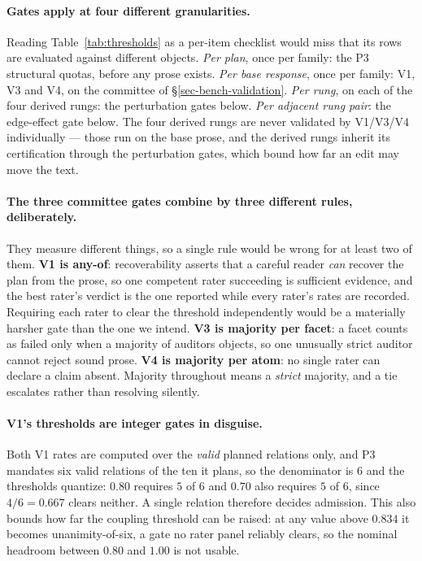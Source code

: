 \paragraph{Gates apply at four different granularities.} Reading Table~\ref{tab:thresholds} as a
per-item checklist would miss that its rows are evaluated against different objects.
\emph{Per plan}, once per family: the P3 structural quotas, before any prose exists.
\emph{Per base response}, once per family: V1, V3 and V4, on the committee of
\S\ref{sec-bench-validation}. \emph{Per rung}, on each of the four derived rungs: the perturbation gates
below. \emph{Per adjacent rung pair}: the edge-effect gate below. The four derived rungs are never
validated by V1/V3/V4 individually --- those run on the base prose, and the derived rungs inherit its
certification through the perturbation gates, which bound how far an edit may move the text.

\paragraph{The three committee gates combine by three different rules, deliberately.} They measure
different things, so a single rule would be wrong for at least two of them.
\textbf{V1 is any-of}: recoverability asserts that a careful reader \emph{can} recover the plan from the
prose, so one competent rater succeeding is sufficient evidence, and the best rater's verdict is the one
reported while every rater's rates are recorded. Requiring each rater to clear the threshold independently
would be a materially harsher gate than the one we intend. \textbf{V3 is majority per facet}: a facet
counts as failed only when a majority of auditors objects, so one unusually strict auditor cannot reject
sound prose. \textbf{V4 is majority per atom}: no single rater can declare a claim absent. Majority
throughout means a \emph{strict} majority, and a tie escalates rather than resolving silently.

\paragraph{V1's thresholds are integer gates in disguise.} Both V1 rates are computed over the
\emph{valid} planned relations only, and P3 mandates six valid relations of the ten it plans, so the
denominator is $6$ and the thresholds quantize: $0.80$ requires $5$ of $6$ and $0.70$ also requires $5$ of
$6$, since $4/6 = 0.667$ clears neither. A single relation therefore decides admission. This also bounds
how far the coupling threshold can be raised: at any value above $0.834$ it becomes unanimity-of-six, a
gate no rater panel reliably clears, so the nominal headroom between $0.80$ and $1.00$ is not usable.

